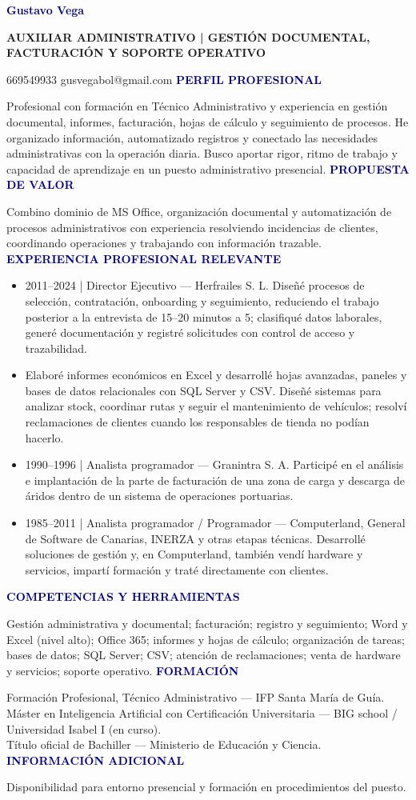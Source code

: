 \documentclass[10pt,a4paper]{article}
\newcommand{\sectiontitle}[1]{\vspace{5pt}\textcolor{navy}{\large\textbf{\MakeUppercase{#1}}}\par\vspace{2pt}}
\begin{document}
{\Huge\textcolor{navy}{\textbf{Gustavo Vega}}}\par
\textcolor{slate}{\textbf{AUXILIAR ADMINISTRATIVO | GESTIÓN DOCUMENTAL, FACTURACIÓN Y SOPORTE OPERATIVO}}\par
669549933 \quad\textbullet\quad gusvegabol@gmail.com\vspace{8pt}
\sectiontitle{Perfil profesional}
\justifying
Profesional con formación en Técnico Administrativo y experiencia en gestión documental, informes, facturación, hojas de cálculo y seguimiento de procesos. He organizado información, automatizado registros y conectado las necesidades administrativas con la operación diaria. Busco aportar rigor, ritmo de trabajo y capacidad de aprendizaje en un puesto administrativo presencial.
\sectiontitle{Propuesta de valor}
Combino dominio de MS Office, organización documental y automatización de procesos administrativos con experiencia resolviendo incidencias de clientes, coordinando operaciones y trabajando con información trazable.
\sectiontitle{Experiencia profesional relevante}
\begin{itemize}
\item 2011--2024 | Director Ejecutivo — Herfrailes S. L. Diseñé procesos de selección, contratación, onboarding y seguimiento, reduciendo el trabajo posterior a la entrevista de 15--20 minutos a 5; clasifiqué datos laborales, generé documentación y registré solicitudes con control de acceso y trazabilidad.
\item Elaboré informes económicos en Excel y desarrollé hojas avanzadas, paneles y bases de datos relacionales con SQL Server y CSV. Diseñé sistemas para analizar stock, coordinar rutas y seguir el mantenimiento de vehículos; resolví reclamaciones de clientes cuando los responsables de tienda no podían hacerlo.
\item 1990--1996 | Analista programador — Granintra S. A. Participé en el análisis e implantación de la parte de facturación de una zona de carga y descarga de áridos dentro de un sistema de operaciones portuarias.
\item 1985--2011 | Analista programador / Programador — Computerland, General de Software de Canarias, INERZA y otras etapas técnicas. Desarrollé soluciones de gestión y, en Computerland, también vendí hardware y servicios, impartí formación y traté directamente con clientes.
\end{itemize}
\sectiontitle{Competencias y herramientas}
Gestión administrativa y documental; facturación; registro y seguimiento; Word y Excel (nivel alto); Office 365; informes y hojas de cálculo; organización de tareas; bases de datos; SQL Server; CSV; atención de reclamaciones; venta de hardware y servicios; soporte operativo.
\sectiontitle{Formación}
Formación Profesional, Técnico Administrativo — IFP Santa María de Guía.\\
Máster en Inteligencia Artificial con Certificación Universitaria — BIG school / Universidad Isabel I (en curso).\\
Título oficial de Bachiller — Ministerio de Educación y Ciencia.
\sectiontitle{Información adicional}
Disponibilidad para entorno presencial y formación en procedimientos del puesto.
\end{document}

